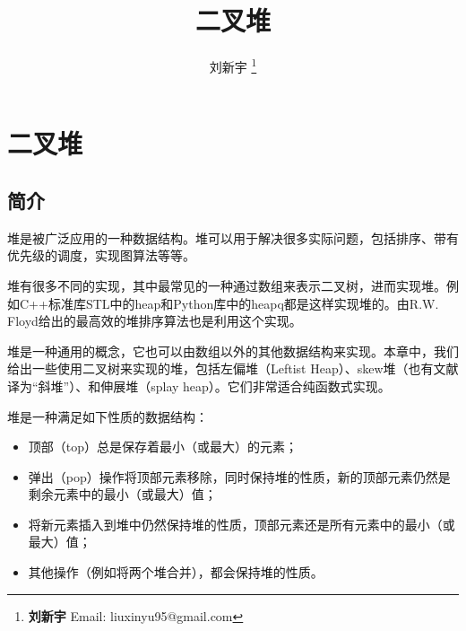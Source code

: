 \documentclass[UTF8]{article}
\begin{document}


\title{二叉堆}

\author{刘新宇
\thanks{{\bfseries 刘新宇 } \newline
  Email: liuxinyu95@gmail.com \newline}
  }

\maketitle
\fi


\ifx\wholebook\relax
\chapter{二叉堆}
\fi

\section{简介}
\label{introduction}

堆是被广泛应用的一种数据结构。堆可以用于解决很多实际问题，包括排序、带有优先级的调度，实现图算法等等\cite{wiki-heap}。

堆有很多不同的实现，其中最常见的一种通过数组来表示二叉树\cite{CLRS}，进而实现堆。例如C++标准库STL中的heap和Python库中的heapq都是这样实现堆的。由R.W. Floyd给出的最高效的堆排序算法也是利用这个实现\cite{wiki-heapsort}\cite{rosetta-heapsort}。

堆是一种通用的概念，它也可以由数组以外的其他数据结构来实现。本章中，我们给出一些使用二叉树来实现的堆，包括左偏堆（Leftist Heap）、skew堆（也有文献译为“斜堆”）、和伸展堆（splay heap）。它们非常适合纯函数式实现\cite{okasaki-book}。

堆是一种满足如下性质的数据结构：
\begin{itemize}
\item 顶部（top）总是保存着最小（或最大）的元素；
\item 弹出（pop）操作将顶部元素移除，同时保持堆的性质，新的顶部元素仍然是剩余元素中的最小（或最大）值；
\item 将新元素插入到堆中仍然保持堆的性质，顶部元素还是所有元素中的最小（或最大）值；
\item 其他操作（例如将两个堆合并），都会保持堆的性质。
\end{itemize}
\end{document}
